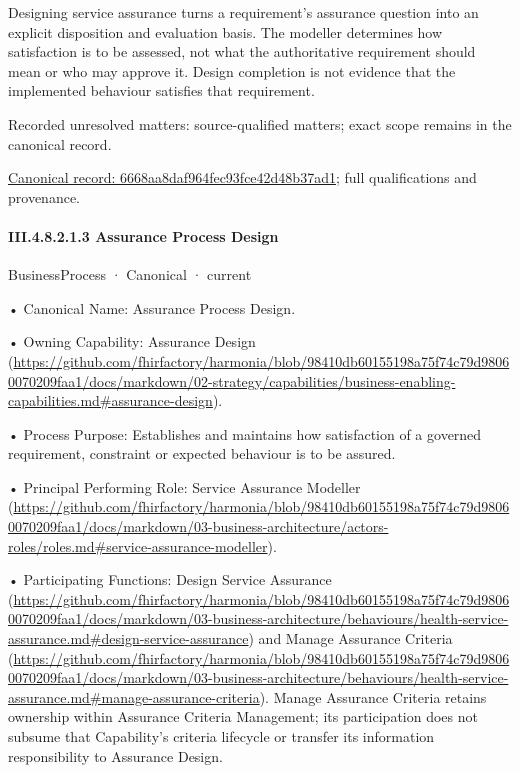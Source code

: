 Designing service assurance turns a requirement's assurance question into an explicit disposition and evaluation basis. The modeller determines how satisfaction is to be assessed, not what the authoritative requirement should mean or who may approve it. Design completion is not evidence that the implemented behaviour satisfies that requirement.


{\small Recorded unresolved matters: source-qualified matters; exact scope remains in the canonical record.}\par
{\footnotesize \href{../../../../../../../../continuum/business/business-function/6668aa8daf964fec93fce42d48b37ad1.md}{Canonical record: 6668aa8daf964fec93fce42d48b37ad1}; full qualifications and provenance.}\par
\paragraph*{III.4.8.2.1.3 Assurance Process Design}
\label{navigation:III.4.8.2.1.3}

\label{element:aec3177dcdd84961814f2ba4f688ad33}
{\small BusinessProcess · Canonical · current}\par

•
Canonical Name: Assurance Process Design.



•
Owning Capability: Assurance Design (\url{https://github.com/fhirfactory/harmonia/blob/98410db60155198a75f74c79d98060070209faa1/docs/markdown/02-strategy/capabilities/business-enabling-capabilities.md#assurance-design}).



•
Process Purpose: Establishes and maintains how satisfaction of a governed requirement, constraint or expected behaviour is to be assured.



•
Principal Performing Role: Service Assurance Modeller (\url{https://github.com/fhirfactory/harmonia/blob/98410db60155198a75f74c79d98060070209faa1/docs/markdown/03-business-architecture/actors-roles/roles.md#service-assurance-modeller}).



•
Participating Functions: Design Service Assurance (\url{https://github.com/fhirfactory/harmonia/blob/98410db60155198a75f74c79d98060070209faa1/docs/markdown/03-business-architecture/behaviours/health-service-assurance.md#design-service-assurance}) and Manage Assurance Criteria (\url{https://github.com/fhirfactory/harmonia/blob/98410db60155198a75f74c79d98060070209faa1/docs/markdown/03-business-architecture/behaviours/health-service-assurance.md#manage-assurance-criteria}). Manage Assurance Criteria retains ownership within Assurance Criteria Management; its participation does not subsume that Capability's criteria lifecycle or transfer its information responsibility to Assurance Design.



